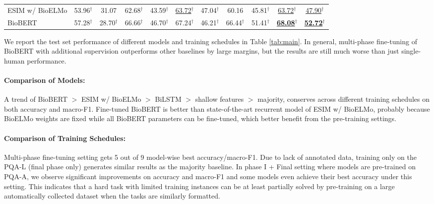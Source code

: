 \documentclass[11pt,a4paper]{article}
\begin{document}
\begin{table*}
\begin{tabular}{lcccccccccc}
        \hspace{0.1cm}ESIM w/ BioELMo & 53.96$^\dagger$ & 31.07 & 62.68$^\dagger$ & 43.59$^\dagger$ & \underline{63.72}$^\dagger$ & 47.04$^\dagger$ & 60.16 & 45.81$^\dagger$ & \underline{63.72}$^\dagger$ & \underline{47.90}$^\dagger$ \\
        \hspace{0.1cm}BioBERT & 57.28$^\dagger$ & 28.70$^\dagger$ & 66.66$^\dagger$ & 46.70$^\dagger$ & 67.24$^\dagger$ & 46.21$^\dagger$ & 66.44$^\dagger$ & 51.41$^\dagger$ & \textbf{\underline{68.08}}$^\dagger$ & \textbf{\underline{52.72}}$^\dagger$ \\
        \bottomrule
    \end{tabular}
    \vskip -0.15cm
    \caption{Main results on PQA-L test set under reasoning-required setting. A.S.: additional supervision. $^\dagger$with A.S. is better than without A.S. Underlined numbers are model-wise best performance, and bolded numbers are global best performance. All numbers are percentages.} \label{tab:main}
\end{table*}
We report the test set performance of different models and training schedules in Table \ref{tab:main}. In general, multi-phase fine-tuning of BioBERT with additional supervision outperforms other baselines by large margins, but the results are still much worse than just single-human performance. 

\paragraph{Comparison of Models:} A trend of BioBERT $>$ ESIM w/ BioELMo $>$ BiLSTM $>$ shallow features $>$ majority, conserves across different training schedules on both accuracy and macro-F1. Fine-tuned BioBERT is better than state-of-the-art recurrent model of ESIM w/ BioELMo, probably because BioELMo weights are fixed while all BioBERT parameters can be fine-tuned, which better benefit from the pre-training settings.

\paragraph{Comparison of Training Schedules:} Multi-phase fine-tuning setting gets 5 out of 9 model-wise best accuracy/macro-F1. Due to lack of annotated data, training only on the PQA-L (final phase only) generates similar results as the majority baseline. In phase I + Final setting where models are pre-trained on PQA-A, we observe significant improvements on accuracy and macro-F1 and some models even achieve their best accuracy under this setting. This indicates that a hard task with limited training instances can be at least partially solved by pre-training on a large automatically collected dataset when the tasks are similarly formatted.
\end{document}
